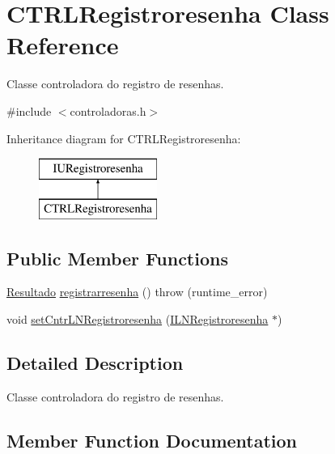 \hypertarget{classCTRLRegistroresenha}{}\section{C\+T\+R\+L\+Registroresenha Class Reference}
\label{classCTRLRegistroresenha}


Classe controladora do registro de resenhas.  




{\ttfamily \#include $<$controladoras.\+h$>$}

Inheritance diagram for C\+T\+R\+L\+Registroresenha\+:\begin{figure}[H]
\begin{center}
\leavevmode
\includegraphics[height=2.000000cm]{classCTRLRegistroresenha}
\end{center}
\end{figure}
\subsection*{Public Member Functions}
\begin{DoxyCompactItemize}
\item 
\hyperlink{classResultado}{Resultado} \hyperlink{classCTRLRegistroresenha_a53e19d05d395441fa0ac54d184a8c186}{registrarresenha} ()  throw (runtime\+\_\+error)
\item 
void \hyperlink{classCTRLRegistroresenha_a89128992373f3a1e857e49294e820dc3}{set\+Cntr\+L\+N\+Registroresenha} (\hyperlink{classILNRegistroresenha}{I\+L\+N\+Registroresenha} $\ast$)
\end{DoxyCompactItemize}


\subsection{Detailed Description}
Classe controladora do registro de resenhas. 

\subsection{Member Function Documentation}
\mbox{\label{classCTRLRegistroresenha_a53e19d05d395441fa0ac54d184a8c186}} 
